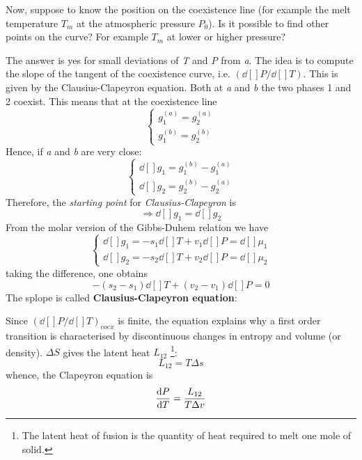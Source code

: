 \documentclass[../main/main.tex]{subfiles}
\begin{document}
Now, suppose to know the position on the coexistence line (for example the melt temperature \( T_m \) at the atmospheric pressure \( P_0 \)). Is it possible to find other points on the curve? For example \( T_m \) at lower or higher pressure?


The answer is yes for small deviations of \emph{T} and \emph{P} from \emph{a}. The idea is to compute the slope of the tangent of the coexistence curve, i.e. \( (\dd[]{P}/\dd[]{T}  )  \). This is given by the Clausius-Clapeyron equation.
Both at \emph{a} and \emph{b} the two phases 1 and 2 coexist. This means  that at the coexistence line
\begin{equation}
  \begin{cases}
   g_1^{(a)} = g_2^{(a)}\\
   g_1^{(b)} = g_2^{(b)}
  \end{cases}
\label{eq:}
\end{equation}
Hence, if \emph{a} and \emph{b} are very close:
\begin{equation}
  \begin{cases}
  \dd[]{g_1} = g_1^{(b)} - g_1^{(a)} \\
  \dd[]{g_2} = g_2^{(b)} - g_2^{(a)}
  \end{cases}
\label{eq:}
\end{equation}
Therefore, the \emph{starting point} for \emph{Clausius-Clapeyron} is
\begin{equation}
  \Rightarrow \dd[]{g_1} =\dd[]{g_2}
  \label{eq:}
\end{equation}
From the molar version of the Gibbs-Duhem relation we have
\begin{equation}
  \begin{cases}
   \dd[]{g_1} = -s_1 \dd[]{T} + v_1 \dd[]{P} = \dd[]{\mu _1}    \\
   \dd[]{g_2} = -s_2 \dd[]{T} + v_2 \dd[]{P} = \dd[]{\mu _2}
  \end{cases}
\label{eq:}
\end{equation}
taking the difference, one obtains
\begin{equation*}
  -(s_2 - s_1) \dd[]{T} + (v_2 - v_1) \dd[]{P} = 0
\end{equation*}
The splope is called \textbf{Clausius-Clapeyron equation}:
\begin{remark}
Since \( (\dd[]{P}/\dd[]{T})_{coex}   \) is finite, the equation explains why a first order transition is characterised by discontinuous changes in entropy and volume (or density). \( \Delta S \)  gives the latent heat \( L_{12} \) \footnote{The latent heat of fusion is the quantity of heat required to melt one mole of solid.}:
\begin{equation}
  L_{12} = T \Delta s
\end{equation}
whence, the Clapeyron equation is
\begin{equation}
  \dv{P}{T}  = \frac{L_{12}}{T \Delta v}
\end{equation}
\end{remark}
\end{document}
